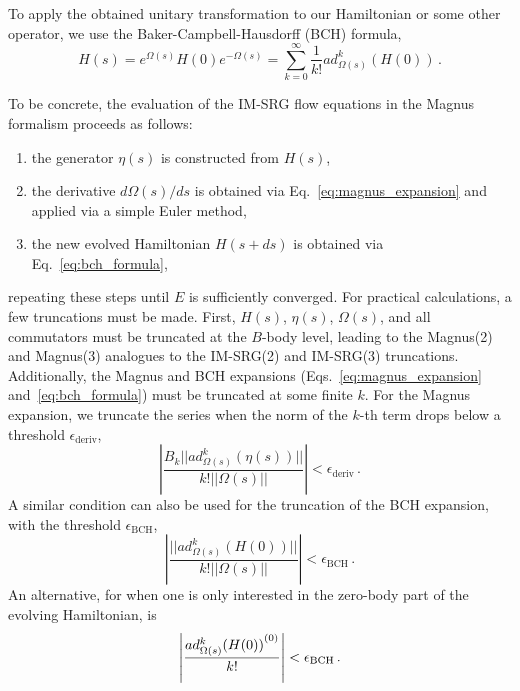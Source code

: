 To apply the obtained unitary transformation to our Hamiltonian or some other operator,
we use the Baker-Campbell-Hausdorff (BCH) formula,
\begin{equation}\label{eq:bch_formula}
  H(s) = e^{\Omega(s)} H(0) e^{-\Omega(s)} = \sum_{k=0}^{\infty} \frac{1}{k!} ad^{k}_{\Omega(s)}(H(0))\,.
\end{equation}

To be concrete, the evaluation of the IM-SRG flow equations in the Magnus formalism
proceeds as follows:
\begin{enumerate}
  \item the generator $\eta(s)$ is constructed from $H(s)$,
  \item the derivative $d\Omega(s)/ds$ is obtained via Eq.~\ref{eq:magnus_expansion}
    and applied via a simple Euler method, %
  \item the new evolved Hamiltonian $H(s+ds)$ is obtained via Eq.~\ref{eq:bch_formula},
\end{enumerate}
repeating these steps until $E$ is sufficiently converged.
For practical calculations, a few truncations must be made.
First, $H(s)$, $\eta(s)$, $\Omega(s)$, and all commutators must be truncated
at the $B$-body level,
leading to the Magnus(2) and Magnus(3) analogues to the IM-SRG(2) and IM-SRG(3) truncations.
Additionally, the Magnus and BCH expansions
(Eqs.~\ref{eq:magnus_expansion} and~\ref{eq:bch_formula})
must be truncated at some finite $k$.
For the Magnus expansion, we truncate the series when the norm of the $k$-th term
drops below a threshold $\epsilon_{\text{deriv}}$,
\begin{equation}
  \left\vert \frac{B_k || ad^{k}_{\Omega(s)}(\eta(s))||}{k!||\Omega(s)||} \right\vert < \epsilon_{\text{deriv}}\,.
\end{equation}
A similar condition can also be used for the truncation of the BCH expansion,
with the threshold $\epsilon_{\text{BCH}}$,
\begin{equation}
  \left\vert \frac{|| ad^{k}_{\Omega(s)}(H(0))||}{k!||\Omega(s)||} \right\vert < \epsilon_{\text{BCH}}\,.
\end{equation}
An alternative, for when one is only interested in the zero-body part of the evolving Hamiltonian,
is
\begin{equation}
  \left\vert \frac{{ad^{k}_{\Omega(s)}(H(0))}^{(0)}}{k!} \right\vert < \epsilon_{\text{BCH}}\,.
\end{equation}

